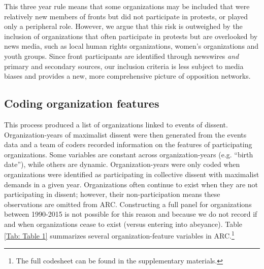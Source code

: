 This three year rule means that some organizations may be included that were
relatively new members of fronts but did not participate in protests, or played
only a peripheral role. However, we argue that this risk is outweighed by the
inclusion of organizations that often participate in protests but are overlooked
by news media, such as local human rights organizations, women's organizations
and youth groups. Since front participants are identified through newswires
\textit{and} primary and secondary sources, our inclusion criteria is less
subject to media biases and provides a new, more comprehensive picture of
opposition networks.


\subsection{Coding organization features}

This process produced a list of organizations linked to events of dissent.
Organization-years of maximalist dissent were then generated from the events
data and a team of coders recorded information on the features of participating
organizations. Some variables are constant across organization-years (e.g.
``birth date''), while others are dynamic. Organization-years were only coded
when organizations were identified as participating in collective dissent with
maximalist demands in a given year. Organizations often continue to exist when
they are not participating in dissent; however, their non-participation means
these observations are omitted from ARC. Constructing a full panel for
organizations between 1990-2015 is not possible for this reason and because we
do not record if and when organizations cease to exist (versus entering into
abeyance). Table \ref{Tab: Table 1} summarizes several organization-feature
variables in ARC.\footnote{The full codesheet can be found in the supplementary
materials.} 

